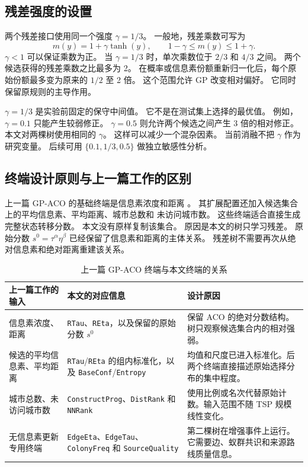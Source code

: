 \documentclass[letterpaper,journal]{IEEEtran}
\begin{document}
\subsection{残差强度的设置}

两个残差接口使用同一个强度 \(\gamma=1/3\)。
一般地，残差乘数可写为
\begin{equation}
 m(y)=1+\gamma\tanh(y),\qquad
 1-\gamma\leq m(y)\leq1+\gamma .
 \label{eq:residual-radius-zh}
\end{equation}
\(\gamma<1\) 可以保证乘数为正。
当 \(\gamma=1/3\) 时，单次乘数位于 \(2/3\) 和 \(4/3\) 之间。
两个候选获得的残差乘数之比最多为 2。
在概率或信息素份额重新归一化后，每个原始份额最多变为原来的
\(1/2\) 至 2 倍。
这个范围允许 GP 改变相对偏好。
它同时保留原规则的主导作用。

\(\gamma=1/3\) 是实验前固定的保守中间值。
它不是在测试集上选择的最优值。
例如，\(\gamma=0.1\) 只能产生较弱修正。
\(\gamma=0.5\) 则允许两个候选之间产生 3 倍的相对修正。
本文对两棵树使用相同的 \(\gamma\)。
这样可以减少一个混杂因素。
当前消融不把 \(\gamma\) 作为研究变量。
后续可用 \(\{0.1,1/3,0.5\}\) 做独立敏感性分析。

\subsection{终端设计原则与上一篇工作的区别}

上一篇 GP-ACO 的基础终端是信息素浓度和距离
\cite{lin2025gpaco}。
其扩展配置还加入候选集合上的平均信息素、平均距离、城市总数和
未访问城市数。
这些终端适合直接生成完整状态转移分数。
本文没有原样复制该集合。
原因是本文的树只学习残差。
原始分数 \(s^0=\tau^\alpha\eta^\beta\) 已经保留了信息素和距离的主体关系。
残差树不需要再次从绝对信息素和绝对距离重建该关系。

\begin{table}[t]
\caption{上一篇 GP-ACO 终端与本文终端的关系}
\label{tab:terminal-comparison-zh}
\centering
\footnotesize
\renewcommand{\arraystretch}{1.15}
\setlength{\tabcolsep}{3pt}
\begin{tabular}{L{35mm}L{58mm}L{78mm}}
\toprule
上一篇工作的输入 & 本文的对应信息 & 设计原因\\
\midrule
信息素浓度、距离 &
\texttt{RTau}、\texttt{REta}，以及保留的原始分数 \(s^0\) &
保留 ACO 的绝对分数结构。树只观察候选集合内的相对强弱。\\
候选的平均信息素、平均距离 &
\texttt{RTau}/\texttt{REta} 的组内标准化，以及
\texttt{BaseConf}/\texttt{Entropy} &
均值和尺度已进入标准化。后两个终端直接描述原始选择分布的集中程度。\\
城市总数、未访问城市数 &
\texttt{ConstructProg}、\texttt{DistRank} 和 \texttt{NNRank} &
使用比例或名次代替原始计数。输入范围不随 TSP 规模线性变化。\\
无信息素更新专用终端 &
\texttt{EdgeEta}、\texttt{EdgeTau}、\texttt{ColonyFreq} 和
\texttt{SourceQuality} &
第二棵树在增强事件上运行。它需要边、蚁群共识和来源路线质量信息。\\
\bottomrule
\end{tabular}
\end{table}
\end{document}
